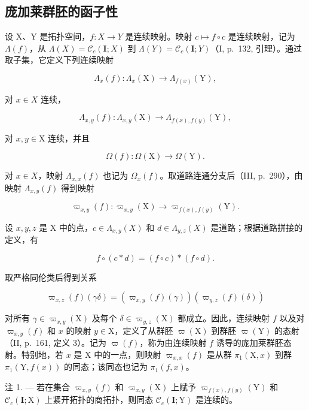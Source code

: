 \subsection{庞加莱群胚的函子性}

设 X、Y 是拓扑空间，\(f: X \to Y\) 是连续映射。映射 \(c \mapsto f \circ c\) 是连续映射，记为 \(\Lambda(f)\)，从 \(\Lambda(X) = \mathcal{C}_c(\mathbf{I}; X)\) 到 \(\Lambda(Y) = \mathcal{C}_c(\mathbf{I}; Y)\)（I, p.~132, 引理）。通过取子集，它定义下列连续映射

\[
\Lambda_ {x} (f) \colon \Lambda_ {x} (\mathrm{X}) \to \Lambda_ {f (x)} (\mathrm{Y}),
\]

对 \(x \in X\) 连续，

\[
\Lambda_ {x, y} (f) \colon \Lambda_ {x, y} (\mathrm{X}) \to \Lambda_ {f (x), f (y)} (\mathrm{Y}),
\]

对 \(x, y \in \mathrm{X}\) 连续，并且

\[
\Omega (f) \colon \Omega (\mathrm{X}) \to \Omega (\mathrm{Y}).
\]

对 \(x \in X\)，映射 \(\Lambda_{x,x}(f)\) 也记为 \(\Omega_x(f)\)。取道路连通分支后（III, p.~290），由映射 \(\Lambda_{x,y}(f)\) 得到映射

\[
\varpi_ {x, y} (f) \colon \varpi_ {x, y} (\mathrm{X}) \to \varpi_ {f (x), f (y)} (\mathrm{Y}).
\]

设 \(x, y, z\) 是 X 中的点，\(c \in \Lambda_{x,y}(X)\) 和 \(d \in \Lambda_{y,z}(X)\) 是道路；根据道路拼接的定义，有

\[
f \circ (c * d) = (f \circ c) * (f \circ d).
\]

取严格同伦类后得到关系

\[
\varpi_ {x, z} (f) (\gamma \delta) = (\varpi_ {x, y} (f) (\gamma)) (\varpi_ {y, z} (f) (\delta))
\]

 对所有 \(\gamma \in \varpi_{x,y}(\mathrm{X})\) 及每个 \(\delta \in \varpi_{y,z}(\mathrm{X})\) 都成立。因此，连续映射 \(f\) 以及对 \(\varpi_{x,y}(f)\) 和 \(x\) 的映射 \(y \in \mathrm{X}\)，定义了从群胚 \(\varpi(\mathrm{X})\) 到群胚 \(\varpi(\mathrm{Y})\) 的态射（II, p.~161, 定义 3）。记为 \(\varpi(f)\)，称为由连续映射 \(f\) 诱导的庞加莱群胚态射。特别地，若 \(x\) 是 X 中的一点，则映射 \(\varpi_{x,x}(f)\) 是从群 \(\pi_1(\mathrm{X}, x)\) 到群 \(\pi_1(\mathrm{Y}, f(x))\) 的同态；该同态也记为 \(\pi_1(f, x)\)。

注 1. --- 若在集合 \(\varpi_{x,y}(f)\) 和 \(\varpi_{x,y}(\mathrm{X})\) 上赋予 \(\varpi_{f(x),f(y)}(\mathrm{Y})\) 和 \(\mathcal{C}_c(\mathbf{I};\mathrm{X})\) 上紧开拓扑的商拓扑，则同态 \(\mathcal{C}_c(\mathbf{I};\mathrm{Y})\) 是连续的。


